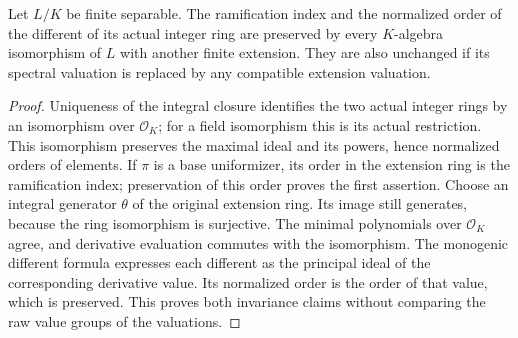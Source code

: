 \begin{lemma}
\label{fw:finite-extension-e-d-invariance}
\leanok
Let $L/K$ be finite separable. The ramification index and the
normalized order of the different of its actual integer ring are
preserved by every $K$-algebra isomorphism of $L$ with another
finite extension. They are also unchanged if its spectral
valuation is replaced by any compatible extension valuation.
\end{lemma}
\begin{proof}
Uniqueness of the integral closure identifies the two actual
integer rings by an isomorphism over $\mathcal O_K$; for a field
isomorphism this is its actual restriction. This isomorphism
preserves the maximal ideal and its powers, hence normalized
orders of elements. If $\pi$ is a base uniformizer, its order in
the extension ring is the ramification index; preservation of
this order proves the first assertion. Choose an integral
generator $\theta$ of the original extension ring. Its image
still generates, because the ring isomorphism is surjective.
The minimal polynomials over $\mathcal O_K$ agree, and derivative
evaluation commutes with the isomorphism. The monogenic different
formula expresses each different as the principal ideal of the
corresponding derivative value. Its normalized order is the order
of that value, which is preserved. This proves both invariance
claims without comparing the raw value groups of the valuations.
\end{proof}

